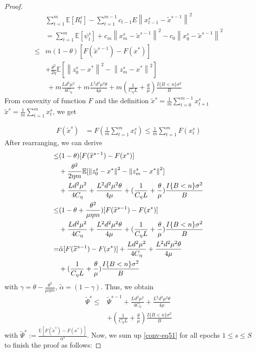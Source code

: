 \documentclass{article}
\newcommand*{\E}{\mathbb{E}}
\newcommand{\norm}[1]{\left\lVert#1\right\rVert}
\theoremstyle{definition}
\theoremstyle{remark}
\begin{document}
{\begin{proof}
\begin{equation}
\begin{split}
&\sum_{t=1}^{m} \E[R_{t}^s]-\sum_{t=1}^{m-1}c_{t-1} E\norm{x_{t-1}^s-\widetilde{x}^{s-1}}^2\\
&= \sum_{t=1}^{m}\E[\psi_{t}^s] + c_{m}\norm{x_{m}^s-\widetilde{x}^{s-1}}^2-c_{0}\norm{x_{0}^s-\widetilde{x}^{s-1}}^2\\
\leq &m(1-\theta)[F(\widetilde{x}^{s-1})-F(x^*)] \\
&+ {\frac{ \theta^2}{2\eta}}\E[\norm{z_{0}^s-x^*}^2-\norm{z_{m}^s-x^*}^2]\\
&~+m\frac{Ld^2\mu^2}{4C_{\eta}}+m\frac{ L^2d^2\mu^2\theta}{4\mu}+m(\frac{1}{C_{\eta} L}+\frac{\theta}{\mu})\frac{I\{B < n\} \sigma ^2}{B}
\end{split}
\end{equation}
From convexity of function $F$ and the definition $\widetilde{x}^s = \frac{1}{m}\sum_{t=0}^{m-1}x_{t+1}^s$ $\widetilde{x}^s = \frac{1}{m}\sum_{t=1}^{m}x_{t}^s$, we get 

\begin{equation}
\begin{split}
F(\widetilde{x}^s) &= F(\frac{1}{m}\sum_{t=1}^{m} x_{t}^s)\leq \frac{1}{m}\sum_{t=1}^{m}F(x_{t}^s)
\end{split}
\end{equation}
After rearranging, we can derive
\begin{align}
[F(\widetilde{x}^{s})-F(x^*)] \leq &(1-\theta)[F(\widetilde{x}^{s-1})-F(x^*)]\notag \\
&+ {\frac{ \theta^2}{2\eta m}}\E[\norm{z_{0}^s-x^*}^2-\norm{z_{m}^s-x^*}^2]\notag\\
&+\frac{Ld^2\mu^2}{4C_{\eta}}+\frac{ L^2d^2\mu^2\theta}{4\mu}+(\frac{1}{C_{\eta} L}+\frac{\theta}{\mu})\frac{I\{B < n\} \sigma ^2}{B}\notag\\
\leq&(1-\theta+\frac{ \theta^2}{\mu\eta m})[F(\widetilde{x}^{s-1})-F(x^*)] \notag\\
&+\frac{Ld^2\mu^2}{4C_{\eta}}+\frac{ L^2d^2\mu^2\theta}{4\mu}+(\frac{1}{C_{\eta} L}+\frac{\theta}{\mu})\frac{I\{B < n\} \sigma ^2}{B}\\
=&\tilde{\alpha}[F(\widetilde{x}^{s-1})-F(x^*)] +\frac{Ld^2\mu^2}{4C_{\eta}}+\frac{ L^2d^2\mu^2\theta}{4\mu}\notag\\
&+(\frac{1}{C_{\eta} L}+\frac{\theta}{\mu})\frac{I\{B < n\} \sigma ^2}{B}\notag
\end{align}
with $\gamma  = \theta - \frac{ \theta^2}{\mu\eta m}$, $\tilde{\alpha} = (1-\gamma)$. Thus, we obtain
 {\color{blue}
\begin{equation}\label{conv-eq51}
\begin{split}
\widetilde{\Psi}^s \leq& \widetilde{\Psi}^{s-1} + \frac{Ld^2\mu^2}{4C_{\eta}}+\frac{ L^2d^2\mu^2\theta}{4\mu}\\
&+(\frac{1}{C_{\eta} L}+\frac{\theta}{\mu})\frac{I\{B < n\} \sigma ^2}{B}
\end{split}
\end{equation}
}
with $\widetilde{\Psi}^s := \frac{\E[F(\tilde{x}^s)-F(x^*)]}{{\alpha}^s}$. Now, we sum up \eqref{conv-eq51} for all epochs $1 \leq s \leq S$ to finish the proof as follows:


\end{proof}}
\end{document}
